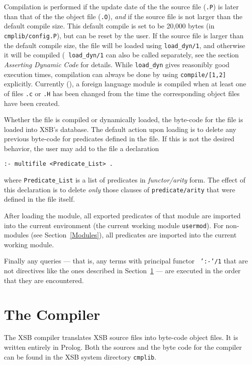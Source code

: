 Compilation is performed if the update date of the the source file
({\tt *.P}) is later than that of the the object file ({\tt *.O}),
{\em and} if the source file is not larger than the default compile
size.  This default compile is set to be 20,000 bytes (in {\tt
cmplib/config.P}), but can be reset by the user.  If the source file
is larger than the default compile size, the file will be loaded using
{\tt load\_dyn/1}, and otherwise it will be compiled ({\tt
load\_dyn/1} can also be called separately, see the section {\it
Asserting Dynamic Code} for details.
While {\tt load\_dyn} gives reasonibly good execution times,
compilation can always be done by using {\tt compile/[1,2]}
explicitly.  Currently (\version), a foreign language module is
compiled when at least one of files {\tt *.c} or {\tt *.H} has been
changed from the time the corresponding object files have been
created.

Whether the file is compiled or dynamically loaded, the byte-code for
the file is loaded into XSB's database.  The default action upon
loading is to delete any previous byte-code for predicates defined in
the file.  If this is not the desired behavior, the user may add to
the file a declaration 
\begin{center}
{\tt :- multifile <Predicate\_List> .} \\
\end{center}
where {\tt Predicate\_List} is a list of predicates in {\em
functor/arity\/} form.  The effect of this declaration is to delete {\em
only\/} those clauses of {\tt predicate/arity} that were defined in the
file itself.

After loading the module, all exported predicates of that module are
imported into the current environment (the current working
module {\tt usermod}).  For non-modules (see Section~\ref{Modules}),
all predicates are imported into the current working module.

Finally any queries --- that is, any terms with principal functor {\tt
':-'/1} that are not directives like the ones described in
Section~\ref{the_compiler} --- are executed in the order that they are
encountered.

\section{The Compiler} \label{the_compiler} 

The XSB compiler translates XSB source files into
byte-code object files.  It is written entirely in Prolog.
Both the sources and the byte code
for the compiler can be found in the XSB system directory
{\tt cmplib}.

